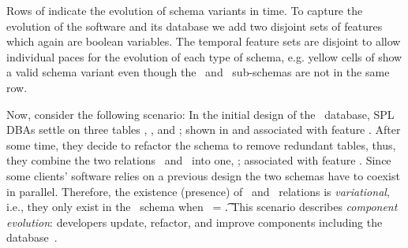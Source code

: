 %
Rows of  indicate the evolution of schema variants in time.
To capture the evolution of the software and its database we add 
two disjoint sets of features which again are boolean variables.
The temporal feature sets are disjoint to allow 
individual paces for the evolution of each type of schema, e.g.
yellow cells of  show a valid schema variant even though
the \basic\ and \educational\ sub-schemas are not in the same row. 
%

Now, consider the following scenario:
In the initial design of the \basic\ database, SPL  DBAs
settle on three tables \engemp, \othemp, and \job; shown in  and associated
with feature \vOne. 
After some time, they decide
to refactor the schema to remove redundant tables,
thus, they combine the two
relations \engemp\ and \othemp\ into one, \empacct; associated with  feature \vTwo. 
Since some clients' 
software relies on a previous design the two schemas have to coexist in parallel.
Therefore, the existence (presence) of \engemp\ and \othemp\
relations is \emph{variational}, i.e., they only exist in the \basic\
schema when \vOne\ = \t.
This scenario describes \emph{component evolution}:
developers
update, refactor, and improve components including the database~\cite{dbSPLevolve}.

